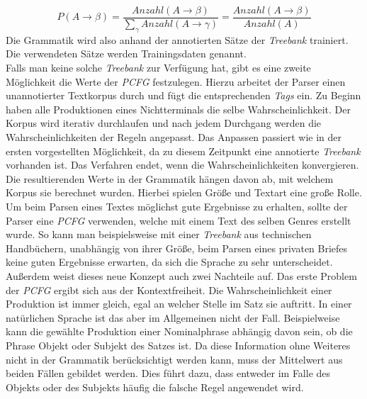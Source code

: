 \begin{equation}
P(A \to \beta) = \frac{Anzahl(A \to \beta)}{ \sum_{\gamma} Anzahl(A \to \gamma)} = \frac{Anzahl(A \to \beta)}{Anzahl(A)}
\end{equation}
Die Grammatik wird also anhand der annotierten Sätze der \textit{Treebank} trainiert. Die verwendeten Sätze werden Trainingsdaten genannt. \\
Falls man keine solche \textit{Treebank} zur Verfügung hat, gibt es eine zweite Möglichkeit die Werte der \textit{PCFG} festzulegen. Hierzu arbeitet der Parser einen unannotierter Textkorpus durch und fügt die entsprechenden \textit{Tags} ein. Zu Beginn haben alle Produktionen eines Nichtterminals die selbe Wahrscheinlichkeit. Der Korpus wird iterativ durchlaufen und nach jedem Durchgang werden die Wahrscheinlichkeiten der Regeln angepasst. Das Anpassen passiert wie in der ersten vorgestellten Möglichkeit, da zu diesem Zeitpunkt eine annotierte \textit{Treebank} vorhanden ist. Das Verfahren endet, wenn die Wahrscheinlichkeiten konvergieren. \\
Die resultierenden Werte in der Grammatik hängen davon ab, mit welchem Korpus sie berechnet wurden. Hierbei spielen Größe und Textart eine große Rolle. Um beim Parsen eines Textes möglichst gute Ergebnisse zu erhalten, sollte der Parser eine \textit{PCFG} verwenden, welche mit einem Text des selben Genres erstellt wurde. So kann man beispielsweise mit einer \textit{Treebank} aus technischen Handbüchern, unabhängig von ihrer Größe, beim Parsen eines privaten Briefes keine guten Ergebnisse erwarten, da sich die Sprache zu sehr unterscheidet.\\ %
Außerdem weist dieses neue Konzept auch zwei Nachteile auf.
Das erste Problem der \textit{PCFG} ergibt sich aus der Kontextfreiheit. Die Wahrscheinlichkeit einer Produktion ist immer gleich, egal an welcher Stelle im Satz sie auftritt. In einer natürlichen Sprache ist das aber im Allgemeinen nicht der Fall. Beispielweise kann die gewählte Produktion einer Nominalphrase abhängig davon sein, ob die Phrase Objekt oder Subjekt des Satzes ist. Da diese Information ohne Weiteres nicht in der Grammatik berücksichtigt werden kann, muss der Mittelwert aus beiden Fällen gebildet werden. Dies führt dazu, dass entweder im Falle des Objekts oder des Subjekts häufig die falsche Regel angewendet wird. \\
